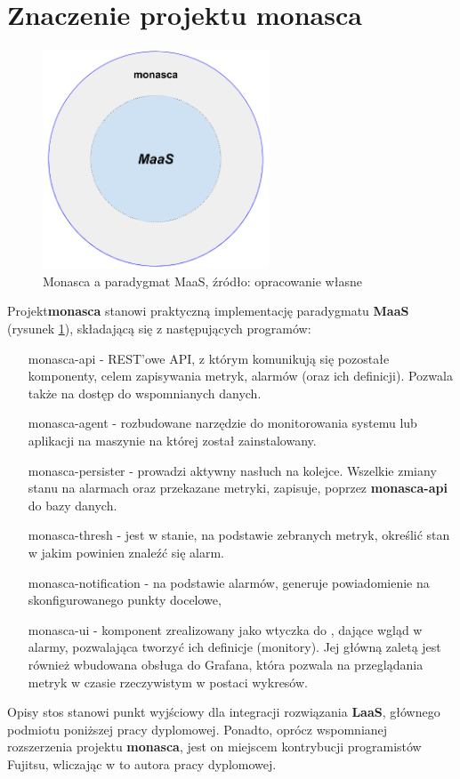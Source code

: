 \section{Znaczenie projektu monasca}

\begin{figure}[H]
    \centering
    \includegraphics[width=0.6\textwidth]{images/monasca_with_maas}
    \caption[Monasca a paradygmat MaaS]{
        Monasca a paradygmat MaaS, źródło: opracowanie własne
    }
    \label{chapter:application:monasca_and_maas}
\end{figure}

Projekt\textbf{monasca} stanowi praktyczną implementację paradygmatu \textbf{MaaS} 
(rysunek \ref{chapter:application:monasca_and_maas}), składającą się z następujących
programów:
\begin{itemize}
    \item[monasca-api] - REST'owe API, z którym komunikują się pozostałe komponenty, celem zapisywania metryk, alarmów (oraz ich definicji).
    Pozwala także na dostęp do wspomnianych danych.
    \item[monasca-agent] - rozbudowane narzędzie do monitorowania systemu lub aplikacji na maszynie na której został zainstalowany.
    \item[monasca-persister] - prowadzi aktywny nasłuch na kolejce. Wszelkie zmiany stanu na alarmach oraz przekazane metryki, zapisuje,
    poprzez \textbf{monasca-api} do bazy danych.
    \item[monasca-thresh] - jest w stanie, na podstawie zebranych metryk, określić stan w jakim powinien znaleźć się alarm.
    \item[monasca-notification] - na podstawie alarmów, generuje powiadomienie na skonfigurowanego punkty docelowe,
    \item[monasca-ui] - komponent zrealizowany jako wtyczka do , dające wgląd w alarmy, pozwalająca tworzyć ich definicje (monitory).
    Jej główną zaletą jest również wbudowana obsługa do Grafana, która pozwala na przeglądania metryk w czasie rzeczywistym w postaci wykresów.
\end{itemize}

Opisy stos stanowi punkt wyjściowy dla integracji rozwiązania \textbf{LaaS}, głównego
podmiotu poniższej pracy dyplomowej. Ponadto, oprócz wspomnianej rozszerzenia projektu \textbf{monasca}, jest on miejscem kontrybucji programistów Fujitsu, wliczając w to autora
pracy dyplomowej. 